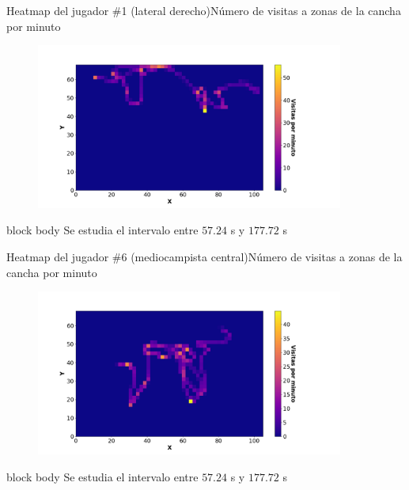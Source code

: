 \documentclass{beamer}
\begin{document}
            \begin{frame}{Heatmap del jugador \#1 (lateral derecho)}{Número de visitas a zonas de la cancha por minuto}
                \begin{figure}[H!]
                    \includegraphics[width=0.9\textwidth]{./heatmap_jugador_1}
                    \label{fig:futbol_13}
                \end{figure}
                \begin{beamercolorbox}[sep=5pt,center]{block body}
                    \centering
                    \small{Se estudia el intervalo entre $57.24$ s y $177.72$ s}
                \end{beamercolorbox}
            \end{frame}

            \begin{frame}{Heatmap del jugador \#6 (mediocampista central)}{Número de visitas a zonas de la cancha por minuto}
                \begin{figure}[H!]
                    \includegraphics[width=0.9\textwidth]{./heatmap_jugador_6}
                    \label{fig:futbol_14}
                \end{figure}
                \begin{beamercolorbox}[sep=5pt,center]{block body}
                    \centering
                    \small{Se estudia el intervalo entre $57.24$ s y $177.72$ s}
                \end{beamercolorbox}
            \end{frame}
\end{document}
